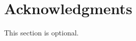 \documentclass{sig-alternate-05-2015}
\begin{document}
\section{Acknowledgments}
This section is optional.

%

%
%
\end{document}
